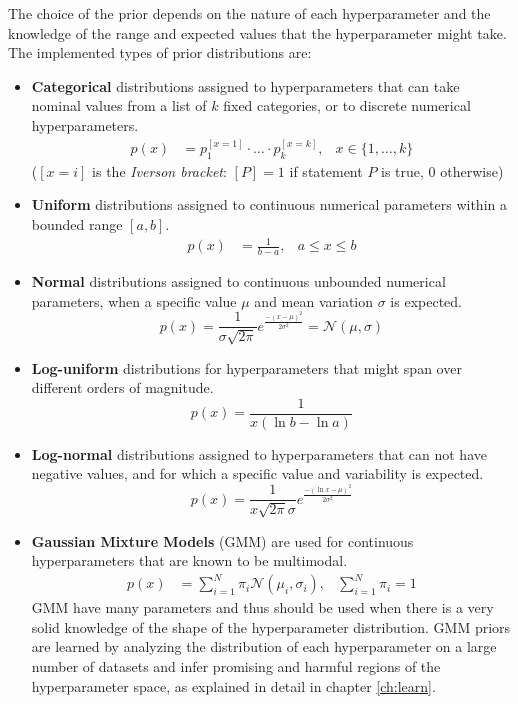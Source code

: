 	The choice of the prior depends on the nature of each hyperparameter and the knowledge of the
	range and expected values that the hyperparameter might take. The implemented types of prior
	distributions are:
	\begin{itemize}
		\item {\bf Categorical} distributions assigned to hyperparameters that can take nominal values
		from a list of $k$ fixed categories, or to discrete numerical hyperparameters.
		\begin{align}
			p(x) &= p_1^{[x=1]}\cdot \ldots \cdot p_k^{[x=k]}, & x \in \{1,\ldots,k\}
		\end{align}
		($[x=i]$ is the \emph{Iverson bracket}: $[P] = 1$ if statement $P$ is true, $0$ otherwise)
		\item {\bf Uniform} distributions assigned to continuous numerical parameters within a
		bounded range $[a,b]$.
		\begin{align}
			p(x) &= \frac 1 {b - a}, & a \leq x \leq b
		\end{align}
		\item {\bf Normal} distributions assigned to continuous unbounded numerical parameters, when
		a specific value $\mu$ and mean variation $\sigma$ is expected.
		\begin{equation}
			p(x) = \frac 1 {\sigma \sqrt{2\pi}} e^ \frac {-(x - \mu)^2} {2 \sigma^2} =
			\mathcal{N}(\mu, \sigma)
		\end{equation}
		\item {\bf Log-uniform} distributions for hyperparameters that might span over different
		orders of magnitude.
		\begin{equation}
			p(x) = \frac 1 {x(\ln b - \ln a)}
		\end{equation}
		\item {\bf Log-normal} distributions assigned to hyperparameters that can not have negative
		values, and for which a specific value and variability is expected.
		\begin{equation}
			p(x) = \frac 1 {x\sqrt{2\pi}\sigma} e^ \frac{-(\ln x - \mu)^2} {2\sigma^2}
		\end{equation}
		\item {\bf Gaussian Mixture Models} (GMM) are used for continuous hyperparameters that are
		known to be multimodal.
		\begin{align}
			p(x) &= \sum_{i=1}^N \pi_i \mathcal{N}(\mu_i, \sigma_i),&\sum_{i=1}^N \pi_i = 1
		\end{align}
		GMM have many parameters and thus should be used when there is a very solid knowledge of the
		shape of the hyperparameter distribution. GMM priors are learned by analyzing the
		distribution of each hyperparameter on a large number of datasets and infer promising and
		harmful regions of the hyperparameter space, as explained in detail in chapter
		\ref{ch:learn}. 
	\end{itemize}

